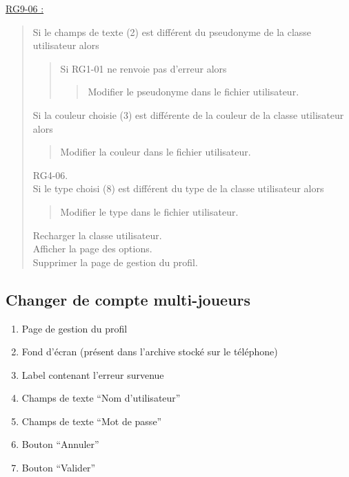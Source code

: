 \documentclass{report}
\begin{document}
			\underline{RG9-06 :}
				\begin{quote}
					Si le champs de texte (2) est différent du pseudonyme de la classe utilisateur alors
					\begin{quote}
						Si RG1-01 ne renvoie pas d'erreur alors
						\begin{quote}
							Modifier le pseudonyme dans le fichier utilisateur.
						\end{quote}
					\end{quote}
					Si la couleur choisie (3) est différente de la couleur de la classe utilisateur alors
					\begin{quote}
						Modifier la couleur dans le fichier utilisateur.
					\end{quote}	
					RG4-06.\\
					Si le type choisi (8) est différent du type de la classe utilisateur alors
					\begin{quote}
						Modifier le type dans le fichier utilisateur.
					\end{quote}	
					Recharger la classe utilisateur.\\
					Afficher la page des options\footnotemark[4].\\
					Supprimer la page de gestion du profil\footnotemark[2].
				\end{quote}
				

\newpage

	\subsection{Changer de compte multi-joueurs}
		
		\hypertarget{Changer de compte multi-joueurs}{}
		\label{Changer de compte multi-joueurs}
			
		\begin{center}
			
		\end{center}
		
		\begin{enumerate}
		  \item Page de gestion du profil
		  \item Fond d'écran (présent dans l'archive stocké sur le téléphone)
		  \item Label contenant l’erreur survenue
		  \item Champs de texte ``Nom d'utilisateur''
		  \item Champs de texte ``Mot de passe''
		  \item Bouton ``Annuler''
		  \item Bouton ``Valider''
		\end{enumerate}
\end{document}

